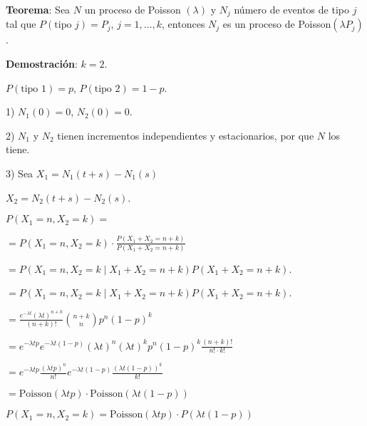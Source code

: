 \documentclass[12pt,a4paper]{article}
\newcommand{\teorema}[1]{%
\begin{teoremabox}
\textbf{Teorema}: #1
\end{teoremabox}
}
\begin{document}
\teorema{Sea $N$ un proceso de Poisson $(\lambda)$ y $N_j$ número de eventos de tipo $j$ tal que $P(\text{tipo } j) = P_j$, $j = 1, \ldots, k$, entonces $N_j$ es un proceso de Poisson$(\lambda P_j)$.}

\textbf{Demostración}: $k = 2$.

$P(\text{tipo } 1) = p$, $P(\text{tipo } 2) = 1 - p$.

1) $N_1(0) = 0$, $N_2(0) = 0$.

2) $N_1$ y $N_2$ tienen incrementos independientes y estacionarios, por que $N$ los tiene.

3) Sea $X_1 = N_1(t+s) - N_1(s)$

$X_2 = N_2(t+s) - N_2(s)$.

$P(X_1 = n, X_2 = k) =$

$= P(X_1 = n, X_2 = k) \cdot \frac{P(X_1 + X_2 = n+k)}{P(X_1 + X_2 = n+k)}$

$= P(X_1 = n, X_2 = k \mid X_1 + X_2 = n+k) P(X_1 + X_2 = n+k)$.

$= P(X_1 = n, X_2 = k \mid X_1 + X_2 = n+k) P(X_1 + X_2 = n+k)$.

$= \frac{e^{-\lambda t} (\lambda t)^{n+k}}{(n+k)!} \binom{n+k}{n} p^n (1-p)^k$

\begin{center}
\end{center}

$= e^{-\lambda t p} e^{-\lambda t(1-p)} (\lambda t)^n (\lambda t)^k p^n (1-p)^k \frac{(n+k)!}{n! \cdot k!}$

$= e^{-\lambda t p} \frac{(\lambda t p)^n}{n!} e^{-\lambda t(1-p)} \frac{(\lambda t(1-p))^k}{k!}$

$= \text{Poisson}(\lambda t p) \cdot \text{Poisson}(\lambda t(1-p))$

$P(X_1 = n, X_2 = k) = \text{Poisson}(\lambda t p) \cdot P(\lambda t(1-p))$

\vspace{1cm}
\end{document}
